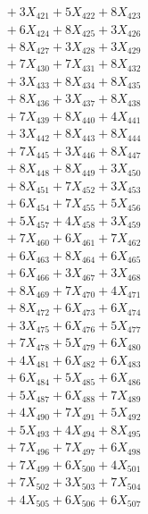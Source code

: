 \documentclass[a4paper,10pt]{article}
\begin{document}
{\begin{align}
&\;  + 3 X_{421} + 5 X_{422} + 8 X_{423} \\[0.3ex]
&\;  + 6 X_{424} + 8 X_{425} + 3 X_{426} \\[0.3ex]
&\;  + 8 X_{427} + 3 X_{428} + 3 X_{429} \\[0.5ex]\allowbreak
&\;  + 7 X_{430} + 7 X_{431} + 8 X_{432} \\[0.3ex]
&\;  + 3 X_{433} + 8 X_{434} + 8 X_{435} \\[0.3ex]
&\;  + 8 X_{436} + 3 X_{437} + 8 X_{438} \\[0.3ex]
&\;  + 7 X_{439} + 8 X_{440} + 4 X_{441} \\[0.3ex]
&\;  + 3 X_{442} + 8 X_{443} + 8 X_{444} \\[0.3ex]
&\;  + 7 X_{445} + 3 X_{446} + 8 X_{447} \\[0.3ex]
&\;  + 8 X_{448} + 8 X_{449} + 3 X_{450} \\[0.3ex]
&\;  + 8 X_{451} + 7 X_{452} + 3 X_{453} \\[0.3ex]
&\;  + 6 X_{454} + 7 X_{455} + 5 X_{456} \\[0.3ex]
&\;  + 5 X_{457} + 4 X_{458} + 3 X_{459} \\[0.5ex]\allowbreak
&\;  + 7 X_{460} + 6 X_{461} + 7 X_{462} \\[0.3ex]
&\;  + 6 X_{463} + 8 X_{464} + 6 X_{465} \\[0.3ex]
&\;  + 6 X_{466} + 3 X_{467} + 3 X_{468} \\[0.3ex]
&\;  + 8 X_{469} + 7 X_{470} + 4 X_{471} \\[0.3ex]
&\;  + 8 X_{472} + 6 X_{473} + 6 X_{474} \\[0.3ex]
&\;  + 3 X_{475} + 6 X_{476} + 5 X_{477} \\[0.3ex]
&\;  + 7 X_{478} + 5 X_{479} + 6 X_{480} \\[0.3ex]
&\;  + 4 X_{481} + 6 X_{482} + 6 X_{483} \\[0.3ex]
&\;  + 6 X_{484} + 5 X_{485} + 6 X_{486} \\[0.3ex]
&\;  + 5 X_{487} + 6 X_{488} + 7 X_{489} \\[0.5ex]\allowbreak
&\;  + 4 X_{490} + 7 X_{491} + 5 X_{492} \\[0.3ex]
&\;  + 5 X_{493} + 4 X_{494} + 8 X_{495} \\[0.3ex]
&\;  + 7 X_{496} + 7 X_{497} + 6 X_{498} \\[0.3ex]
&\;  + 7 X_{499} + 6 X_{500} + 4 X_{501} \\[0.3ex]
&\;  + 7 X_{502} + 3 X_{503} + 7 X_{504} \\[0.3ex]
&\;  + 4 X_{505} + 6 X_{506} + 6 X_{507} \\[0.3ex]

\end{align}}
\end{document}
